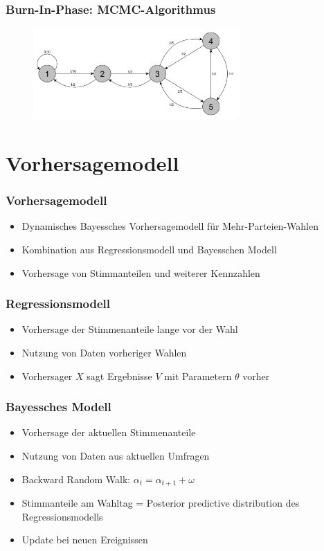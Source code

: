 \documentclass[aspectratio=169,xcolor=dvipsnames]{beamer}
\begin{document}
\begin{frame}
\frametitle{Burn-In-Phase: MCMC-Algorithmus}
\begin{figure}
\includegraphics[width=0.7\textwidth]{Markov_Chain2}
\end{figure}
\end{frame}

\section{Vorhersagemodell}

\begin{frame}
	\frametitle{Vorhersagemodell}
		\begin{itemize}
			\item Dynamisches Bayessches Vorhersagemodell für Mehr-Parteien-Wahlen 
			\item Kombination aus Regressionsmodell und Bayesschen Modell
			\item Vorhersage von Stimmanteilen und weiterer Kennzahlen
		\end{itemize}
\end{frame}

\begin{frame}
	\frametitle{Regressionsmodell}
	\begin{itemize}
		\item Vorhersage der Stimmenanteile lange vor der Wahl
		\item Nutzung von Daten vorheriger Wahlen
		\item Vorhersager $X$ sagt Ergebnisse $V$ mit Parametern $\theta$ vorher
	\end{itemize}
\end{frame}

\begin{frame}
	\frametitle{Bayessches Modell}
	\begin{itemize}
		\item<1 -> Vorhersage der aktuellen Stimmenanteile
		\item<1 -> Nutzung von Daten aus aktuellen Umfragen
		\item<2 -> Backward Random Walk: $\alpha_t = \alpha_{t+1} + \omega$
		\item<3 -> Stimmanteile am Wahltag = Posterior predictive distribution des Regressionsmodells
		\item<4 -> Update bei neuen Ereignissen
	\end{itemize}
\end{frame}
\end{document}

